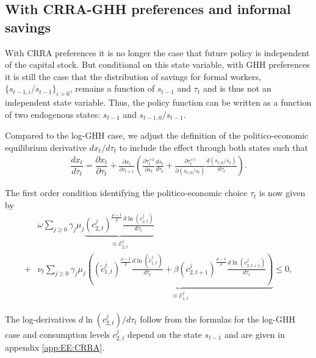 \subsection{With CRRA-GHH preferences and informal savings}\label{app:PEE:CRRA}

With CRRA preferences it is no longer the case that future policy is independent of the capital stock. But conditional on this state variable, with GHH preferences it is still the case that the distribution of savings for formal workers, $\{s_{t-1,i}/s_{t-1}\}_{i>0}$, remains a function of $s_{t-1}$ and $\tau_t$ and is thus not an independent state variable. Thus, the policy function can be written as a function of two endogenous states: $s_{t-1}$ and $s_{t-1,0}/s_{t-1}$. 

Compared to the log-GHH case, we adjust the definition of the politico-economic equilibrium derivative $dx_t/d\tau_t$ to include the effect through both states such that 
\begin{align*}
    \dfrac{d x_t}{d \tau_t} = \dfrac{\partial x_t}{\partial \tau_t}+\frac{\partial x_t}{\partial \tau_{t+1}}\left(\frac{\partial \tau_t^{+1}}{\partial s_t}\frac{d s_t}{d \tau_t}+\frac{\partial \tau_t^{+1}}{\partial (s_{t,0}/s_t)}\frac{ d (s_{t,0}/s_t)}{d\tau_t}\right).
\end{align*}

The first order condition identifying the politico-economic choice $\tau_t$ is now given by
\begin{align*}
    &\omega \sum_{j\geq 0} \gamma_j\mu_j\underbrace{ \left(c_{2,t}^j\right)^{\frac{\rho-1}{\rho}}\frac{d\ln\left(c_{2,t}^j\right)}{d\tau_t}}_{\equiv \mathcal{E}_{2,t}^j} \\+&\nu_t\sum_{j\geq0}\gamma_j\mu_j\underbrace{\left(\left(\tilde{c}_{1,t}^j\right)^{\frac{\rho-1}{\rho}}\frac{d\ln\left(\tilde{c}_{1,t}^j\right)}{d\tau_t}+\beta \left(c_{2,t+1}^j\right)^{\frac{\rho-1}{\rho}}\frac{d\ln\left(c_{2,t+1}^j\right)}{d\tau_t}\right)}_{\equiv \mathcal{E}_{1,t}^j}
    \leq 0,
\end{align*}

The log-derivatives $d\ln\left(c_{2,t}^j\right)/d\tau_t$ follow from the formulas for the log-GHH case and consumption levels $c_{2,t}^j$ depend on the state $s_{t-1}$ and are given in appendix \ref{app:EE:CRRA}.

